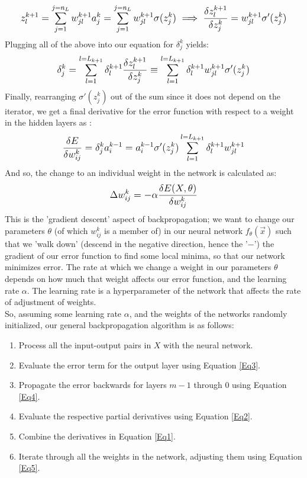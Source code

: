 \documentclass[12pt]{article}
\begin{document}
\begin{equation}
    \mathlarger{
        z^{k+1}_l = \sum\limits_{j=1}^{j=n_{L}}w_{jl}^{k+1}a^{k}_j = \sum\limits_{j=1}^{j=n_{L}}w_{jl}^{k+1}\sigma(z^{k}_j) \implies  \frac{\delta  z^{k+1}_l}{\delta z^k_j} = w_{jl}^{k+1}\sigma'(z^{k}_j)
    }
\end{equation}
Plugging all of the above into our equation for $\delta^k_j$ yields:
\begin{equation}\label{Eq4}
\mathlarger{
        \delta^k_j = \sum\limits_{l=1}^{l=L_{k+1}}\delta^{k+1}_l\frac{\delta  z^{k+1}_l}{\delta z^k_j} \equiv \sum\limits_{l=1}^{l=L_{k+1}}\delta^{k+1}_lw_{jl}^{k+1}\sigma'(z^{k}_j)
    }
\end{equation}
Finally, rearranging $\sigma'(z^{k}_j)$ out of the sum since it does not depend on the iterator, we get a final derivative for the error function with respect to a weight in the hidden layers as :
\begin{equation}
    \mathlarger{
     \frac{\delta E}{\delta w^k_{ij}} =  \delta^k_ja^{k-1}_i = a^{k-1}_i\sigma'(z^{k}_j)\sum\limits_{l=1}^{l=L_{k+1}}\delta^{k+1}_lw_{jl}^{k+1}
    }
 \end{equation}
 And so, the change to an individual weight in the network is calculated as:
 \begin{equation}\label{Eq5}
     \mathlarger{
        \Delta w^k_{ij} = -\alpha \frac{\delta E(X,\theta)}{\delta w^k_{ij}}
     }
 \end{equation}
 This is the 'gradient descent' aspect of backpropagation; we want to change our parameters $\theta$ (of which $w^k_{ij}$ is a member of) in our neural network $f_{\theta}(\vec{x})$  such that we 'walk down' (descend in the negative direction, hence the '$-$') the gradient of our error function to find some local minima, so that our network minimizes error. The rate at which we change a weight in our parameters $\theta$ depends on how much that weight affects our error function, and the learning rate $\alpha$. The learning rate is a hyperparameter of the network that affects the rate of adjustment of weights.
 \\\newline So, assuming some learning rate $\alpha$, and the weights of the networks randomly initialized, our general backpropagation algorithm is as follows:
 \begin{enumerate}
     \item Process all the input-output pairs in $X$ with the neural network.
     \item Evaluate the error term for the output layer using Equation \ref{Eq3}.
     \item Propagate the error backwards for layers $m-1$ through 0 using Equation \ref{Eq4}.
     \item Evaluate the respective partial derivatives using Equation \ref{Eq2}.
     \item Combine the derivatives in Equation \ref{Eq1}.
     \item Iterate through all the weights in the network, adjusting them using Equation \ref{Eq5}.
 \end{enumerate}
\end{document}
